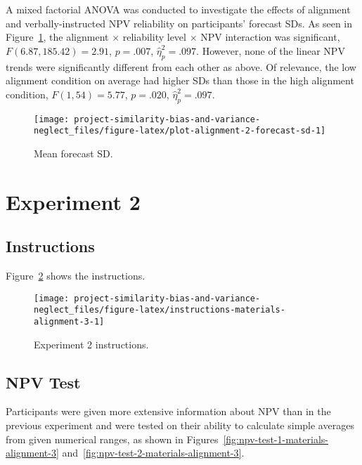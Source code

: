 \documentclass[
  english,
  man, donotrepeattitle,floatsintext]{apa7}
\theoremstyle{definition}
\theoremstyle{definition}
\theoremstyle{definition}
\theoremstyle{definition}
\theoremstyle{remark}
\begin{document}
A mixed factorial ANOVA was conducted to investigate the effects of alignment
and verbally-instructed NPV reliability on participants' forecast SDs. As seen
in Figure~\ref{fig:plot-alignment-2-forecast-sd}, the alignment \(\times\)
reliability level \(\times\) NPV interaction was significant,
\(F(6.87, 185.42) = 2.91\), \(p = .007\), \(\hat{\eta}^2_p = .097\).
However, none of the linear NPV trends were significantly different from each
other as above. Of relevance, the low alignment condition on average had higher
SDs than those in the high alignment condition,
\(F(1, 54) = 5.77\), \(p = .020\), \(\hat{\eta}^2_p = .097\).



\begin{figure}
\texttt{[image: project-similarity-bias-and-variance-neglect\_files/figure-latex/plot-alignment-2-forecast-sd-1]} \caption{Mean forecast SD.}\label{fig:plot-alignment-2-forecast-sd}
\end{figure}

\hypertarget{alignment-3-appendix}{%
\section{Experiment 2}\label{alignment-3-appendix}}

\hypertarget{instructions-materials-alignment-3-appendix}{%
\subsection{Instructions}\label{instructions-materials-alignment-3-appendix}}

Figure~\ref{fig:instructions-materials-alignment-3} shows the instructions.



\begin{figure}
\texttt{[image: project-similarity-bias-and-variance-neglect\_files/figure-latex/instructions-materials-alignment-3-1]} \caption{Experiment 2 instructions.}\label{fig:instructions-materials-alignment-3}
\end{figure}

\hypertarget{npv-test-materials-alignment-3}{%
\subsection{NPV Test}\label{npv-test-materials-alignment-3}}

Participants were given more extensive information about NPV than in the
previous experiment and were tested on their ability to calculate simple
averages from given numerical ranges, as shown in
Figures~\ref{fig:npv-test-1-materials-alignment-3}
and~\ref{fig:npv-test-2-materials-alignment-3}.
\end{document}
